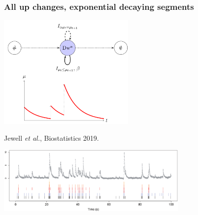 \documentclass{beamer}
\begin{document}

\begin{frame}
  \frametitle{All up changes, exponential decaying segments}
  \includegraphics[width=0.5\textwidth]{gfpop-decay}

  Jewell \emph{et al.}, Biostatistics 2019.

  \includegraphics[width=0.7\textwidth]{intro-neuroscience} 

\end{frame}


\end{document}
